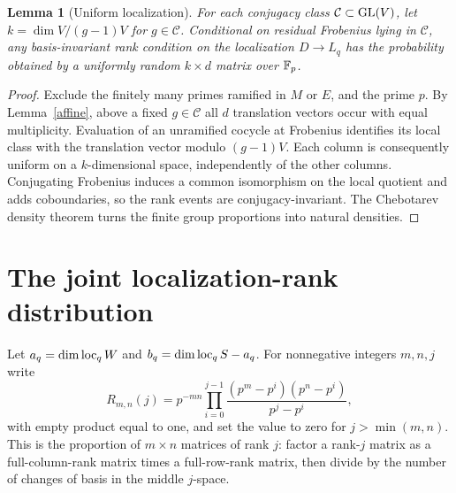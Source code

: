 \documentclass[11pt]{article}
\newtheorem{lemma}[theorem]{Lemma}
\theoremstyle{remark}\newtheorem{remark}[theorem]{Remark}
\begin{document}
\begin{lemma}[Uniform localization]\label{uniform}
For each conjugacy class $\mathcal C\subset\operatorname{GL}(V)$, let $k=\dim V/(g-1)V$ for $g\in\mathcal C$. Conditional on residual Frobenius lying in $\mathcal C$, any basis-invariant rank condition on the localization $D\to L_q$ has the probability obtained by a uniformly random $k\times d$ matrix over $\mathbb F_p$.
\end{lemma}
\begin{proof}
Exclude the finitely many primes ramified in $M$ or $E$, and the prime $p$. By Lemma~\ref{affine}, above a fixed $g\in\mathcal C$ all $d$ translation vectors occur with equal multiplicity. Evaluation of an unramified cocycle at Frobenius identifies its local class with the translation vector modulo $(g-1)V$. Each column is consequently uniform on a $k$-dimensional space, independently of the other columns. Conjugating Frobenius induces a common isomorphism on the local quotient and adds coboundaries, so the rank events are conjugacy-invariant. The Chebotarev density theorem \cite{Milne} turns the finite group proportions into natural densities.
\end{proof}

\section{The joint localization-rank distribution}
Let $a_q=\dim\operatorname{loc}_q W$ and $b_q=\dim\operatorname{loc}_q S-a_q$. For nonnegative integers $m,n,j$ write
\[
 R_{m,n}(j)=p^{-mn}\prod_{i=0}^{j-1}
 \frac{(p^m-p^i)(p^n-p^i)}{p^j-p^i},
\]
with empty product equal to one, and set the value to zero for $j>\min(m,n)$. This is the proportion of $m\times n$ matrices of rank $j$: factor a rank-$j$ matrix as a full-column-rank matrix times a full-row-rank matrix, then divide by the number of changes of basis in the middle $j$-space.
\end{document}
